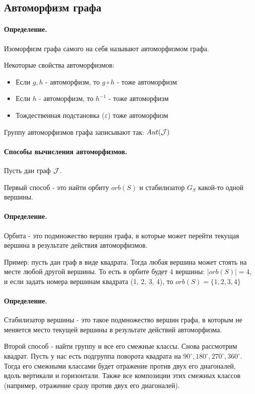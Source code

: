 \documentclass{report}
\begin{document}
\subsection{Автоморфизм графа}
\paragraph*{Определение.}
Изоморфизм графа самого на себя называют автоморфизмом графа.

\medskip

Некоторые свойства автоморфизмов:
\begin{itemize}
	\item Если $g, h$ - автоморфизм, то  $g \circ h$ - тоже автоморфизм
	\item Если  $h$ - автоморфизм, то  $h^{-1}$ - тоже автоморфизм
	\item Тождественная подстановка ($\varepsilon$) тоже автоморфизм
\end{itemize}


\medskip

Группу автоморфизмов графа записывают так: $Aut( {\cal J} )$

\paragraph*{Способы вычисления автоморфизмов.}
Пусть дан граф $ {\cal J}$.

Первый способ - это найти орбиту $orb(S)$ и стабилизатор  $G_{S}$ какой-то одной вершины.

\paragraph*{Определение.}
Орбита - это подмножество вершин графа, в которые может перейти текущая вершина в результате
действия автоморфизмов.

Пример: пусть дан граф в виде квадрата. Тогда любая вершина может стоять на месте любой другой
вершины. То есть в орбите будет 4 вершины: $ \mid orb(S)  \mid  = 4$, и если задать номера вершинам
квадрата (1, 2, 3, 4), то $orb(S) = \{1,2,3,4\} $

\paragraph*{Определение.}
Стабилизатор вершины - это такое подмножество вершин графа, в которым не меняется
место текущей вершины в результате действий автоморфизма.

\medskip
Второй способ - найти группу и все его смежные классы. Снова рассмотрим квадрат.
Пусть у нас есть подгруппа поворота квадрата на $90^{\circ}, 180^{\circ}, 270^{\circ}, 
360^{\circ}$.
Тогда его смежными классами
будет отражение против двух его диагоналей, вдоль вертикали и горизонтали. Также 
все композиции этих смежных классов (например, отражение сразу против двух его диагоналей).
\end{document}
